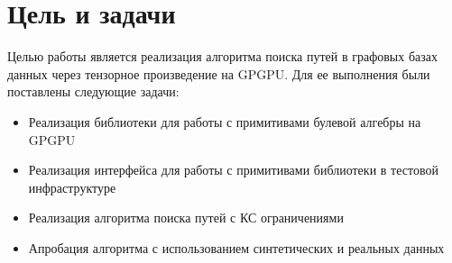 \section{Цель и задачи}

Целью работы является реализация алгоритма поиска путей в графовых базах данных через тензорное произведение на GPGPU. Для ее выполнения были поставлены следующие задачи:

\begin{itemize}
    \item Реализация библиотеки для работы с примитивами булевой алгебры на GPGPU
    \item Реализация интерфейса для работы с примитивами библиотеки в тестовой инфраструктуре
    \item Реализация алгоритма поиска путей с КС ограничениями
    \item Апробация алгоритма с использованием синтетических и реальных данных
\end{itemize}